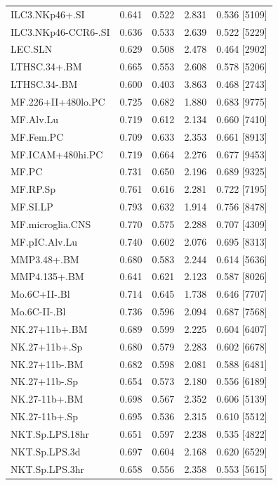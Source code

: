 \begin{longtable}[c]{lrrrr}
ILC3.NKp46+.SI & 0.641 & 0.522 & 2.831 & 0.536 [5109]  \\
ILC3.NKp46-CCR6-.SI & 0.636 & 0.533 & 2.639 & 0.522 [5229]  \\
LEC.SLN & 0.629 & 0.508 & 2.478 & 0.464 [2902]  \\
LTHSC.34+.BM & 0.665 & 0.553 & 2.608 & 0.578 [5206]  \\
LTHSC.34-.BM & 0.600 & 0.403 & 3.863 & 0.468 [2743]  \\
MF.226+II+480lo.PC & 0.725 & 0.682 & 1.880 & 0.683 [9775]  \\
MF.Alv.Lu & 0.719 & 0.612 & 2.134 & 0.660 [7410]  \\
MF.Fem.PC & 0.709 & 0.633 & 2.353 & 0.661 [8913]  \\
MF.ICAM+480hi.PC & 0.719 & 0.664 & 2.276 & 0.677 [9453]  \\
MF.PC & 0.731 & 0.650 & 2.196 & 0.689 [9325]  \\
MF.RP.Sp & 0.761 & 0.616 & 2.281 & 0.722 [7195]  \\
MF.SI.LP & 0.793 & 0.632 & 1.914 & 0.756 [8478]  \\
MF.microglia.CNS & 0.770 & 0.575 & 2.288 & 0.707 [4309]  \\
MF.pIC.Alv.Lu & 0.740 & 0.602 & 2.076 & 0.695 [8313]  \\
MMP3.48+.BM & 0.680 & 0.583 & 2.244 & 0.614 [5636]  \\
MMP4.135+.BM & 0.641 & 0.621 & 2.123 & 0.587 [8026]  \\
Mo.6C+II-.Bl & 0.714 & 0.645 & 1.738 & 0.646 [7707]  \\
Mo.6C-II-.Bl & 0.736 & 0.596 & 2.094 & 0.687 [7568]  \\
NK.27+11b+.BM & 0.689 & 0.599 & 2.225 & 0.604 [6407]  \\
NK.27+11b+.Sp & 0.680 & 0.579 & 2.283 & 0.602 [6678]  \\
NK.27+11b-.BM & 0.682 & 0.598 & 2.081 & 0.588 [6481]  \\
NK.27+11b-.Sp & 0.654 & 0.573 & 2.180 & 0.556 [6189]  \\
NK.27-11b+.BM & 0.698 & 0.567 & 2.352 & 0.606 [5139]  \\
NK.27-11b+.Sp & 0.695 & 0.536 & 2.315 & 0.610 [5512]  \\
NKT.Sp.LPS.18hr & 0.651 & 0.597 & 2.238 & 0.535 [4822]  \\
NKT.Sp.LPS.3d & 0.697 & 0.604 & 2.168 & 0.620 [6529]  \\
NKT.Sp.LPS.3hr & 0.658 & 0.556 & 2.358 & 0.553 [5615]  \\

\end{longtable}
